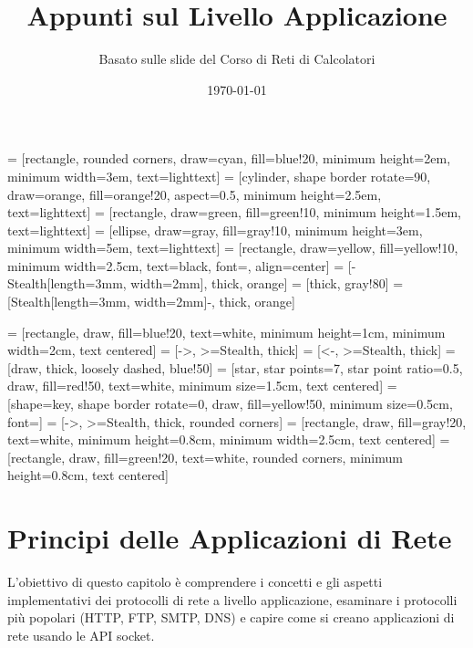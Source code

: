 

\title{\textbf{Appunti sul Livello Applicazione}}
\author{Basato sulle slide del Corso di Reti di Calcolatori}
\date{\today}

 = [rectangle, rounded corners, draw=cyan, fill=blue!20, minimum height=2em, minimum width=3em, text=lighttext]
 = [cylinder, shape border rotate=90, draw=orange, fill=orange!20, aspect=0.5, minimum height=2.5em, text=lighttext]
 = [rectangle, draw=green, fill=green!10, minimum height=1.5em, text=lighttext]
 = [ellipse, draw=gray, fill=gray!10, minimum height=3em, minimum width=5em, text=lighttext]
 = [rectangle, draw=yellow, fill=yellow!10, minimum width=2.5cm, text=black, font=\small, align=center] %
{} = [-{Stealth[length=3mm, width=2mm]}, thick, orange]
 = [thick, gray!80]
 = [{Stealth[length=3mm, width=2mm]}-, thick, orange] %

 = [rectangle, draw, fill=blue!20, text=white,
    minimum height=1cm, minimum width=2cm, text centered]
 = [->, >=Stealth, thick]
 = [<-, >=Stealth, thick]
 = [draw, thick, loosely dashed, blue!50]
 = [star, star points=7, star point ratio=0.5, draw, fill=red!50, text=white, minimum size=1.5cm, text centered]
 = [shape=key, shape border rotate=0, draw, fill=yellow!50, minimum size=0.5cm, font=\tiny]
 = [->, >=Stealth, thick, rounded corners]
 = [rectangle, draw, fill=gray!20, text=white, minimum height=0.8cm, minimum width=2.5cm, text centered]
 = [rectangle, draw, fill=green!20, text=white, rounded corners, minimum height=0.8cm, text centered]



\maketitle
\tableofcontents
\newpage

\section{Principi delle Applicazioni di Rete}
L'obiettivo di questo capitolo è comprendere i concetti e gli aspetti implementativi dei protocolli di rete a livello applicazione, esaminare i protocolli più popolari (HTTP, FTP, SMTP, DNS) e capire come si creano applicazioni di rete usando le API socket.

